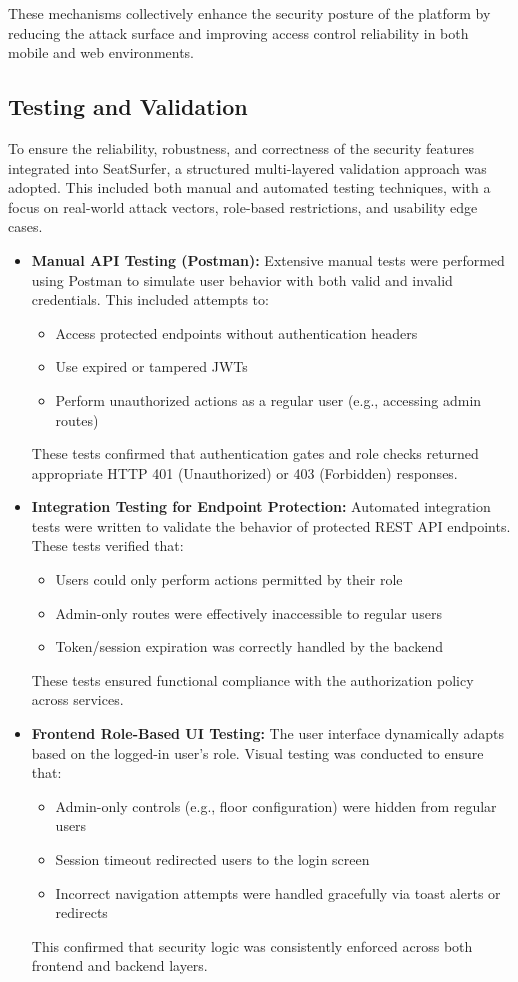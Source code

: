 \documentclass[12pt,a4paper]{report} %
\begin{document}
These mechanisms collectively enhance the security posture of the platform by reducing the attack surface and improving access control reliability in both mobile and web environments.

\subsection{Testing and Validation}

To ensure the reliability, robustness, and correctness of the security features integrated into SeatSurfer, a structured multi-layered validation approach was adopted. This included both manual and automated testing techniques, with a focus on real-world attack vectors, role-based restrictions, and usability edge cases.

\begin{itemize}
\item \textbf{Manual API Testing (Postman):}
Extensive manual tests were performed using Postman to simulate user behavior with both valid and invalid credentials. This included attempts to:
\begin{itemize}
\item Access protected endpoints without authentication headers
\item Use expired or tampered JWTs
\item Perform unauthorized actions as a regular user (e.g., accessing admin routes)
\end{itemize}
These tests confirmed that authentication gates and role checks returned appropriate HTTP 401 (Unauthorized) or 403 (Forbidden) responses.

\item \textbf{Integration Testing for Endpoint Protection:}  
Automated integration tests were written to validate the behavior of protected REST API endpoints. These tests verified that:
\begin{itemize}
    \item Users could only perform actions permitted by their role
    \item Admin-only routes were effectively inaccessible to regular users
    \item Token/session expiration was correctly handled by the backend
\end{itemize}
These tests ensured functional compliance with the authorization policy across services.

\item \textbf{Frontend Role-Based UI Testing:}  
The user interface dynamically adapts based on the logged-in user's role. Visual testing was conducted to ensure that:
\begin{itemize}
    \item Admin-only controls (e.g., floor configuration) were hidden from regular users
    \item Session timeout redirected users to the login screen
    \item Incorrect navigation attempts were handled gracefully via toast alerts or redirects
\end{itemize}
This confirmed that security logic was consistently enforced across both frontend and backend layers.


\end{itemize}
\end{document}
